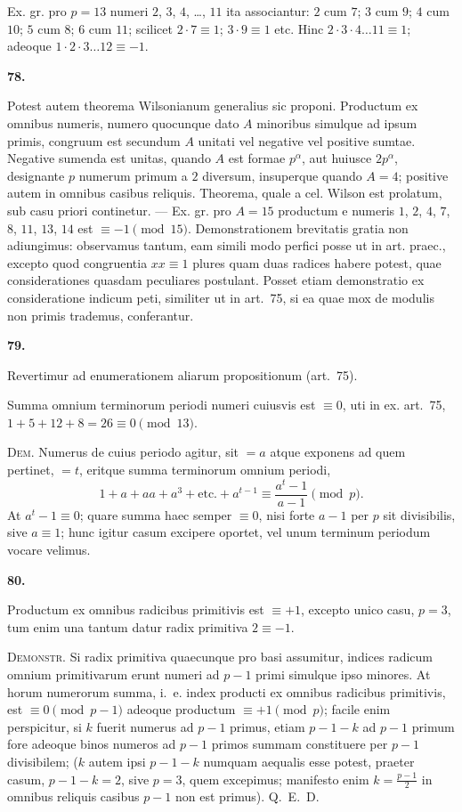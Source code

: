 \documentclass[12pt,a4paper]{article}
\theoremstyle{plain}
\theoremstyle{definition}
\theoremstyle{remark}
\begin{document}
Ex. gr. pro $p=13$ numeri $2$, $3$, $4$, \ldots, $11$ ita associantur: $2$ cum $7$; $3$ cum $9$; $4$ cum $10$; $5$ cum $8$; $6$ cum $11$; scilicet $2 \cdot 7 \equiv 1$; $3 \cdot 9 \equiv 1$ etc. Hinc $2 \cdot 3 \cdot 4 \ldots 11 \equiv 1$; adeoque $1 \cdot 2 \cdot 3 \ldots 12 \equiv -1$.

\setcounter{satz}{78}
\addtocounter{satz}{-1}
\textbf{78.}

Potest autem theorema Wilsonianum generalius sic proponi. Productum ex omnibus numeris, numero quocunque dato $A$ minoribus simulque ad ipsum primis, congruum est secundum $A$ unitati vel negative vel positive sumtae. Negative sumenda est unitas, quando $A$ est formae $p^\alpha$, aut huiusce $2p^\alpha$, designante $p$ numerum primum a $2$ diversum, insuperque quando $A=4$; positive autem in omnibus casibus reliquis. Theorema, quale a cel. Wilson est prolatum, sub casu priori continetur. --- Ex. gr. pro $A=15$ productum e numeris $1$, $2$, $4$, $7$, $8$, $11$, $13$, $14$ est $\equiv -1 \pmod{15}$. Demonstrationem brevitatis gratia non adiungimus: observamus tantum, eam simili modo perfici posse ut in art. praec., excepto quod congruentia $xx \equiv 1$ plures quam duas radices habere potest, quae considerationes quasdam peculiares postulant. Posset etiam demonstratio ex consideratione indicum peti, similiter ut in art.~75, si ea quae mox de modulis non primis trademus, conferantur.

\setcounter{satz}{79}
\addtocounter{satz}{-1}
\textbf{79.}

Revertimur ad enumerationem aliarum propositionum (art.~75).

Summa omnium terminorum periodi numeri cuiusvis est $\equiv 0$, uti in ex. art.~75, $1+5+12+8=26 \equiv 0 \pmod{13}$.

\textsc{Dem.} Numerus de cuius periodo agitur, sit $=a$ atque exponens ad quem pertinet, $=t$, eritque summa terminorum omnium periodi,
\[1 + a + aa + a^3 + \text{etc.} + a^{t-1} \equiv \frac{a^t-1}{a-1} \pmod{p}.\]
At $a^t-1 \equiv 0$; quare summa haec semper $\equiv 0$, nisi forte $a-1$ per $p$ sit divisibilis, sive $a \equiv 1$; hunc igitur casum excipere oportet, vel unum terminum periodum vocare velimus.

\setcounter{satz}{80}
\addtocounter{satz}{-1}
\textbf{80.}

Productum ex omnibus radicibus primitivis est $\equiv +1$, excepto unico casu, $p=3$, tum enim una tantum datur radix primitiva $2 \equiv -1$.

\textsc{Demonstr.} Si radix primitiva quaecunque pro basi assumitur, indices radicum omnium primitivarum erunt numeri ad $p-1$ primi simulque ipso minores. At horum numerorum summa, i.~e. index producti ex omnibus radicibus primitivis, est $\equiv 0 \pmod{p-1}$ adeoque productum $\equiv +1 \pmod{p}$; facile enim perspicitur, si $k$ fuerit numerus ad $p-1$ primus, etiam $p-1-k$ ad $p-1$ primum fore adeoque binos numeros ad $p-1$ primos summam constituere per $p-1$ divisibilem; ($k$ autem ipsi $p-1-k$ numquam aequalis esse potest, praeter casum, $p-1-k=2$, sive $p=3$, quem excepimus; manifesto enim $k=\frac{p-1}{2}$ in omnibus reliquis casibus $p-1$ non est primus). Q.~E.~D.
\end{document}

